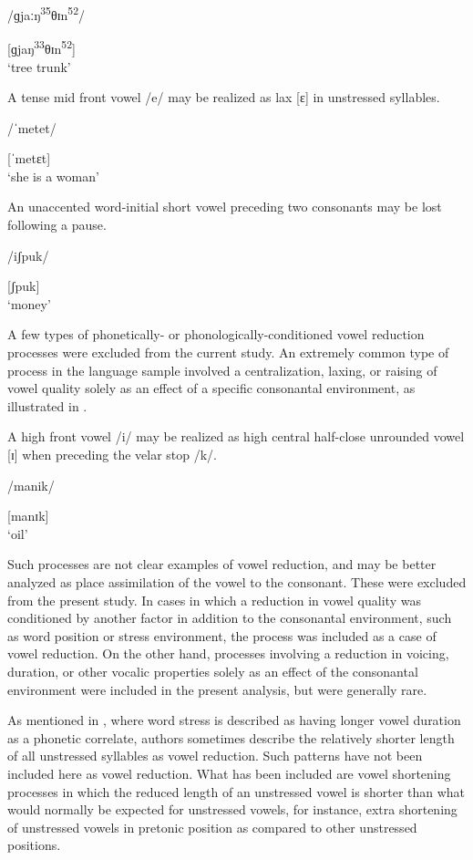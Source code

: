 \ex  /ɡjaːŋ\textsuperscript{35}θɪn\textsuperscript{52}/

[ɡjaŋ\textsuperscript{33}θɪn\textsuperscript{52}]\\
\glt ‘tree trunk’
\citep[117]{Clark2008}
\z
\z

\ea\label{ex:6.8}

A tense mid front vowel /e/ may be realized as lax [ɛ] in unstressed syllables.

/ˈmetet/

[ˈmetɛt]\\
\glt ‘she is a woman’
\citep[38]{Bruce1984}
\z

\ea\label{ex:6.9}

An unaccented word-initial short vowel preceding two consonants may be lost following a pause. 

/iʃpuk/

[ʃpuk]\\
\glt ‘money’
\citep[53]{Bright1957}
\z

  A few types of phonetically- or phonologically-conditioned vowel reduction processes were excluded from the current study. An extremely common type of process in the language sample involved a centralization, laxing, or raising of vowel quality solely as an effect of a specific consonantal environment, as illustrated in .

\ea\label{ex:6.10}

A high front vowel /i/ may be realized as high central half-close unrounded vowel [ɪ] when preceding the velar stop /k/.

/manik/

[manɪk]\\
\glt ‘oil’
\citep[15]{Dol2007}
\z

Such processes are not clear examples of vowel reduction, and may be better analyzed as place assimilation of the vowel to the consonant. These were excluded from the present study. In cases in which a reduction in vowel quality was conditioned by another factor in addition to the consonantal environment, such as word position or stress environment, the process was included as a case of vowel reduction. On the other hand, processes involving a reduction in voicing, duration, or other vocalic properties solely as an effect of the consonantal environment were included in the present analysis, but were generally rare.

  As mentioned in , where word stress is described as having longer vowel duration as a phonetic correlate, authors sometimes describe the relatively short\-er length of all unstressed syllables as vowel reduction. Such patterns have not been included here as vowel reduction. What has been included are vowel shortening processes in which the reduced length of an unstressed vowel is shorter than what would normally be expected for unstressed vowels, for instance, extra shortening of unstressed vowels in pretonic position as compared to other unstressed positions.

